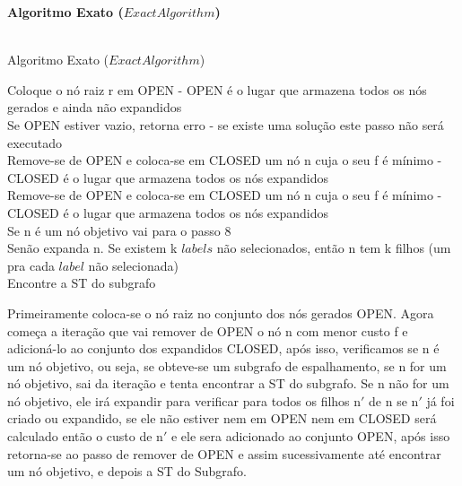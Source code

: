 \documentclass[12pt]{article}
\begin{document}
	\noindent\textbf{Algoritmo Exato ($Exact Algorithm$)}\\
	\\
	\begin{algorithm}[H]
		\caption{Algoritmo Exato ($Exact Algorithm$)}
		Coloque o nó raiz r em OPEN - OPEN é o lugar que armazena todos os nós gerados e ainda não expandidos\\
		Se OPEN estiver vazio, retorna erro - se existe uma solução este passo não será executado\\
		Remove-se de OPEN e coloca-se em CLOSED um nó n cuja o seu f é mínimo - CLOSED é o lugar que armazena todos os nós expandidos\\
		Remove-se de OPEN e coloca-se em CLOSED um nó n cuja o seu f é mínimo - CLOSED é o lugar que armazena todos os nós expandidos\\
		Se n é um nó objetivo vai para o passo 8\\
		Senão expanda n. Se existem k $labels$ não selecionados, então n tem k filhos (um pra cada $label$ não selecionada)\\


		Encontre a ST do subgrafo
	\end{algorithm}
	Primeiramente coloca-se o nó raiz no conjunto dos nós gerados OPEN. Agora começa a iteração que vai remover de OPEN o nó n com menor custo f e adicioná-lo ao conjunto dos expandidos CLOSED, após isso, verificamos se n é um nó objetivo, ou seja, se obteve-se um subgrafo de espalhamento, se n for um nó objetivo, sai da iteração e tenta encontrar a ST do subgrafo. Se n não for um  nó objetivo, ele irá expandir para verificar para todos os filhos n$'$ de n se n$'$  já foi criado ou expandido, se ele não estiver nem em OPEN nem em CLOSED será calculado então o custo de n$'$ e ele sera adicionado ao conjunto OPEN, após isso retorna-se ao passo de remover de OPEN e assim sucessivamente até encontrar um nó objetivo, e depois a ST do Subgrafo.
\end{document}
